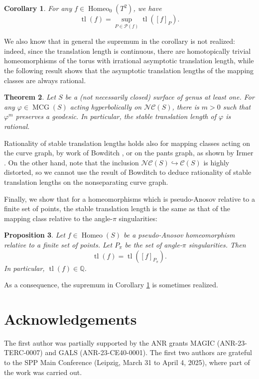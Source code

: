 \documentclass{amsart}
\newcommand{\Pf}{\mathcal{P}}
\newcommand{\C}{\mathcal{C}}
\newcommand{\NC}{\mathcal{NC}}
\DeclareMathOperator{\Homeo}{Homeo}
\DeclareMathOperator{\mcg}{MCG}
\newcommand{\tl}[1]{\operatorname{tl}(#1)}
\newtheorem{thm}{Theorem}[section]
\newtheorem{prop}[thm]{Proposition}
\newtheorem{cor}[thm]{Corollary}
\theoremstyle{definition}
\begin{document}
\begin{cor}\label{cor:torus-case}
For any \(f\in\Homeo_0(T^2)\), we have
\[\tl{f}=\sup_{P\in\Pf(f)}\tl{[f]_{P}}.\]
\end{cor}

We also know that in general the supremum in the corollary is not realized: indeed, since the translation length is continuous, there are homotopically trivial homeomorphisms of the torus with irrational asymptotic translation length, while the following result shows that the asymptotic translation lengths of the mapping classes are always rational.

\begin{thm}\label{thm:rational}
Let \(S\) be a (not necessarily closed) surface of genus at least one. For any \(\varphi\in\mcg(S)\) acting hyperbolically on \(\NC(S)\), there is \(m>0\) such that \(\varphi^m\) preserves a geodesic. In particular, the stable translation length of \(\varphi\) is rational.
\end{thm}

Rationality of stable translation lengths holds also for mapping classes acting on the curve graph, by work of Bowditch \cite{bowditch_tight}, or on the pants graph, as shown by Irmer \cite{irmer_stable}. On the other hand, note that the inclusion \(\NC(S)\hookrightarrow \C(S)\) is highly distorted, so we cannot use the result of Bowditch to deduce rationality of stable translation lengths on the nonseparating curve graph.

Finally, we show that for a homeomorphisms which is pseudo-Anosov relative to a finite set of points, the stable translation length is the same as that of the mapping class relative to the angle-\(\pi\) singularities:

\begin{prop}\label{prop:pA-is-rational}
Let \(f\in\Homeo(S)\) be a pseudo-Anosov homeomorphism relative to a finite set of points. Let \(P_\pi\) be the set of angle-\(\pi\) singularities. Then
\[\tl{f}=\tl{[f]_{P_\pi}}.\]
In particular, \(\tl{f}\in \mathbb{Q}\).
\end{prop}

As a consequence, the supremum in Corollary \ref{cor:torus-case} is sometimes realized.

\section*{Acknowledgements}

The first author was partially supported by the ANR grants MAGIC (ANR-23-TERC-0007) and GALS (ANR-23-CE40-0001). The first two authors are grateful to the SPP Main Conference (Leipzig, March 31 to April 4, 2025), where part of the work was carried out.
\end{document}
